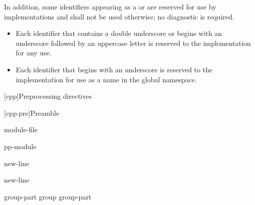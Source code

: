 \pnum
{}%
%
%
In addition, some identifiers
appearing as a  or 
are reserved for use by \Cpp{}
implementations and shall
not be used otherwise; no diagnostic is required.
\begin{itemize}
\item
Each identifier that contains a double underscore
\tcode{\unun}
%
or begins with an underscore followed by
an uppercase letter
%
is reserved to the implementation for any use.
\item
Each identifier that begins with an underscore is
%
reserved to the implementation for use as a name in the global namespace.%
\end{itemize}%

[cpp]{Preprocessing directives}%

%
%


[cpp.pre]{Preamble}

\begin{bnf}
\br
    \br
    module-file
\end{bnf}

\begin{bnf}
\br
     pp-module  
\end{bnf}

\begin{bnf}
\br
     \terminal{;} new-line 
\end{bnf}

\begin{bnf}
\br
     \terminal{:}  \terminal{;} new-line 
\end{bnf}

\begin{bnf}
\br
    group-part\br
    group group-part
\end{bnf}

